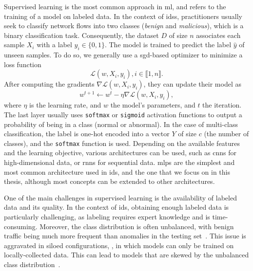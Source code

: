 Supervised learning is the most common approach in \gls{ml}, and refers to the training of a model on labeled data.
In the context of \glspl{ids}, practitioners usually seek to classify network flows into two classes (\emph{benign} and \emph{malicious}), which is a binary classification task.
Consequently, the dataset $D$ of size $n$ associates each sample $X_i$ with a label $y_i \in \lbrace 0,1 \rbrace $.
The model is trained to predict the label $\hat{y}$ of unseen samples.
To do so, we generally use a \gls{sgd}-based optimizer to minimize a loss function
\begin{equation} \label{eq:bg.loss}
  \mathcal{L}(w, X_i, y_i), i \in \llbracket 1, n \rrbracket.
\end{equation}
After computing the gradients $\nabla \mathcal{L}(w, X_i, y_i)$, they can update their model as
\begin{equation} \label{eq:bg.update}
  w^{t+1} \gets w^t - \eta \nabla \mathcal{L}(w, X_i, y_i),
\end{equation}
where $\eta$ is the learning rate, and $w$ the model's parameters, and $t$ the iteration.
The last layer usually uses \texttt{softmax} or \texttt{sigmoid} activation functions to output a probability of being in a class (normal or abnormal).
In the case of multi-class classification, the label is one-hot encoded\footnotemark{} into a vector $Y$ of size $c$ (the number of classes), and the \texttt{softmax} function is used.
Depending on the available features and the learning objective, various architectures can be used, such as \glspl{cnn} for high-dimensional data, or \glspl{rnn} for sequential data.
\Glspl{mlp} are the simplest and most common architecture used in \gls{ids}, and the one that we focus on in this thesis, although most concepts can be extended to other architectures.


One of the main challenges in supervised learning is the availability of labeled data and its quality.
In the context of \gls{ids}, obtaining enough labeled data is particularly challenging, as labeling requires expert knowledge and is time-consuming.
Moreover, the class distribution is often unbalanced, with benign traffic being much more frequent than anomalies in the testing set~\cite{chandola_Anomalydetectionsurvey_2009}.
This issue is aggravated in siloed configurations, \ie, in which models can only be trained on locally-collected data.
This can lead to models that are skewed by the unbalanced class distribution~\cite{campos_EvaluatingFederatedLearning_2022}.

